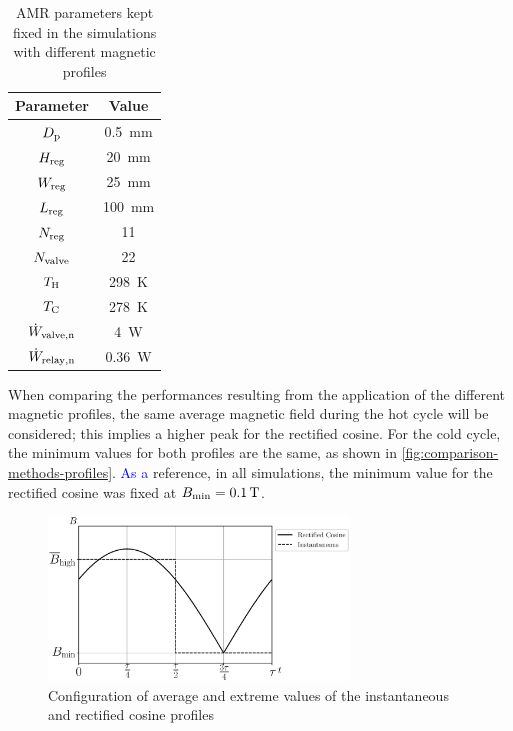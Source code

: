 \documentclass[referee]{svjour3}
\newcommand{\wvalven}{\w\ped{valve,n}}
\newcommand{\wrelayn}{\w\ped{relay,n}}
\begin{document}
\begin{table}[!ht]
  \centering
  \caption{AMR parameters kept fixed in the simulations with different magnetic profiles}
  \begin{tabular}{c|c}
\hline
\textbf{Parameter} & \textbf{Value}\\
\hline
   $D_{\mathrm{p}}$ & \SI{0.5}{\mm}\\
$H_{\mathrm{reg}}$ & \SI{20}{\mm}\\
$W_{\mathrm{reg}}$ & \SI{25}{\mm}\\
$L_{\mathrm{reg}}$ & \SI{100}{\mm}\\
$N_{\mathrm{reg}}$ & 11 \\
$N_{\mathrm{valve}}$ & 22 \\
$T_{\mathrm{H}}$ & \SI{298}{\kelvin}\\
$T_{\mathrm{C}}$ & \SI{278}{\kelvin}\\
$\wvalven$ & \SI{4}{\watt}\\
$\wrelayn$ & \SI{0.36}{\watt}\\
\hline
  \end{tabular}

  \label{tab:params-cobem}
\end{table}



When comparing the performances resulting from the application of the different magnetic profiles, the same average magnetic field during the hot cycle will be considered; this implies a higher peak for the rectified cosine. For the cold cycle, the minimum values for both profiles are the same, as shown in \autoref{fig:comparison-methods-profiles}. \textcolor{blue}{As a} reference, in all simulations,  the minimum value for the rectified cosine was fixed at ${B}_{\mathrm{min}} = \SI{0.1}{\tesla}$. 

\begin{figure}[!ht]
  \centering
\includegraphics[width=8cm]{Fig5-profiles_it_and_rc_same_minimum}
  \caption{Configuration of average and extreme values of the instantaneous and rectified cosine profiles }
  \label{fig:comparison-methods-profiles}
\end{figure}
\end{document}
